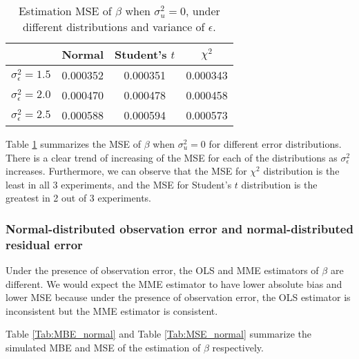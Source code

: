 \documentclass{article}
\begin{document}
\begin{table}[ht]
    \centering
    \caption{Estimation MSE of $\beta$ when $\sigma^2_u=0$, under different distributions and variance of $\epsilon$.}
    \label{Tab:MSE_absence}
    \begin{tabular}[t]{lccc}
        \hline
        &Normal&Student's $t$&$\chi^2$\\
        \hline
        $\sigma^2_\epsilon = 1.5$&0.000352&0.000351&0.000343\\
        $\sigma^2_\epsilon = 2.0$&0.000470&0.000478&0.000458\\
        $\sigma^2_\epsilon = 2.5$&0.000588&0.000594&0.000573\\
        \hline
    \end{tabular}
\end{table}

Table \ref{Tab:MSE_absence} summarizes the MSE of $\beta$ when $\sigma^2_u=0$ for different error distributions.
There is a clear trend of increasing of the MSE for each of the distributions as $\sigma^2_\epsilon$ increases. 
Furthermore, we can observe that the MSE for $\chi^2$ distribution is the least in all 3 experiments, and the MSE for Student's $t$ distribution is the greatest in 2 out of 3 experiments.

\subsubsection{Normal-distributed observation error and normal-distributed residual error}

Under the presence of observation error, the OLS and MME estimators of $\beta$ are different.
We would expect the MME estimator to have lower absolute bias and lower MSE because under the presence of observation error, the OLS estimator is inconsistent but the MME estimator is consistent.

Table \ref{Tab:MBE_normal} and Table \ref{Tab:MSE_normal} summarize the simulated MBE and MSE of the estimation of $\beta$ respectively.
\end{document}
